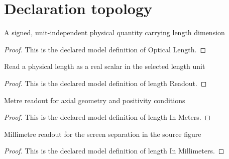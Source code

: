 \section{Declaration topology}
\begin{definition}
  \label{def:physics:phyx-mini-0047:phyxminiproblems-problemphyxmini0047-opticallength}
  A signed, unit-independent physical quantity carrying length dimension
\end{definition}
\begin{proof}
  This is the declared model definition of Optical Length.
\end{proof}
\begin{definition}
  \label{def:physics:phyx-mini-0047:phyxminiproblems-problemphyxmini0047-lengthreadout}
  Read a physical length as a real scalar in the selected length unit
\end{definition}
\begin{proof}
  This is the declared model definition of length Readout.
\end{proof}
\begin{definition}
  \label{def:physics:phyx-mini-0047:phyxminiproblems-problemphyxmini0047-lengthinmeters}
  Metre readout for axial geometry and positivity conditions
\end{definition}
\begin{proof}
  This is the declared model definition of length In Meters.
\end{proof}
\begin{definition}
  \label{def:physics:phyx-mini-0047:phyxminiproblems-problemphyxmini0047-lengthinmillimeters}
  Millimetre readout for the screen separation in the source figure
\end{definition}
\begin{proof}
  This is the declared model definition of length In Millimeters.
\end{proof}
